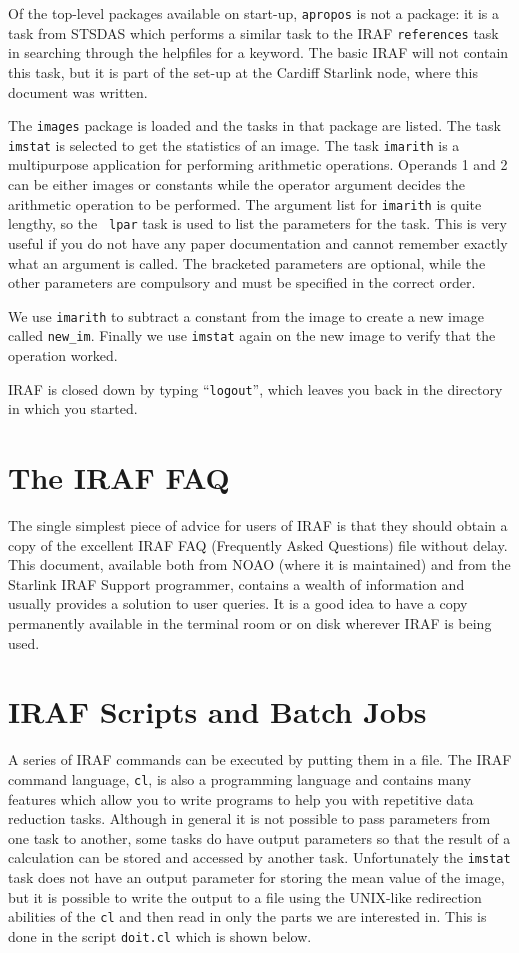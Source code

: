 Of the top-level packages available on start-up, {\tt apropos} is not
a package: it is a task from STSDAS which performs a similar task to
the IRAF {\tt references} task in searching through the helpfiles for
a keyword. The basic IRAF will not contain this task, but it is part
of the set-up at the Cardiff Starlink node,
where this document was written.

The {\tt images} package is loaded and the tasks in that package are
listed.  The task {\tt imstat} is selected to get the statistics of an
image. The task {\tt imarith} is a multipurpose application
for performing arithmetic
operations. Operands 1 and 2 can be either images or constants while
the operator argument decides the arithmetic operation to be
performed. The argument list for {\tt imarith} is quite lengthy, so the {\tt
lpar} task is used to list the parameters for the task. This is very
useful if you do not have any paper documentation and cannot remember
exactly what an argument is called. The bracketed parameters are
optional, while the other parameters are compulsory and must be specified in
the correct order.

We use {\tt imarith} to subtract a constant from the image to create
a new image called {\tt new\_im}. Finally we use {\tt imstat} again on the
new image to verify that the operation worked.

IRAF is closed down by typing ``{\tt logout}'', which leaves you back in
the directory in which you started.

\section{The IRAF FAQ}

The single simplest piece of advice for users of IRAF is that they
should obtain a copy of the excellent IRAF FAQ (Frequently Asked Questions)
file without delay.  This document, available both from NOAO
(where it is maintained)
and from the Starlink IRAF Support programmer, contains a wealth
of information and usually provides a solution to user queries.
It is a good idea to have a copy permanently available in the terminal room
or on disk wherever IRAF is being used.


\section{IRAF Scripts and Batch Jobs}

A series of IRAF commands can be executed by putting them in a
file. The IRAF command language, {\tt cl}, is also a programming language
and contains many features which allow you to write programs to help
you with repetitive data reduction tasks. Although in general it is
not possible to pass parameters from one task to another, some tasks
do have output parameters so that the result of a calculation can be
stored and accessed by another task. Unfortunately the {\tt imstat}
task does not have an output parameter for storing the mean value of
the image, but it is possible to write the output to a file using the
UNIX-like redirection abilities of the {\tt cl} and then read in only the
parts we are interested in. This is done in the script {\tt doit.cl}
which is shown below.

